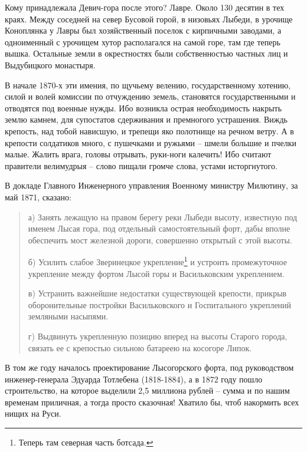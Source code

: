 Кому принадлежала Девич-гора после этого? Лавре. Около 130 десятин в тех краях. Между соседней на север Бусовой горой, в низовьях Лыбеди, в урочище Коноплянка у Лавры был хозяйственный поселок с кирпичными заводами, а одноименный с урочищем хутор располагался на самой горе, там где теперь вышка. Остальные земли в окрестностях были собственностью частных лиц и Выдубицкого монастыря.

В начале 1870-х эти имения, по щучьему велению, государственному хотению, силой и волей комиссии по отчуждению земель, становятся государственными и отводятся под военные нужды. Ибо возникла острая необходимость накрыть землю камнем, для супостатов сдерживания и премногого устрашения. Виждь крепость, над тобой нависшую, и трепещи яко полотнище на речном ветру. А в крепости солдатиков много, с пушечками и ружьями – шмели большие и пчелки малые. Жалить врага, головы отрывать, руки-ноги калечить! Ибо считают правители велимудрыя – слово пищали громче слова, устами исторгнутого.

В докладе Главного Инженерного управления Военному министру Милютину, за май 1871, сказано:

\begin{quotation}
а) Занять лежащую на правом берегу реки Лыбеди высоту, известную под именем Лысая гора, под отдельный самостоятельный форт, дабы вполне обеспечить мост железной дороги, совершенно открытый с этой высоты.

б) Усилить слабое Зверинецкое укрепление\footnote{Теперь там северная часть ботсада.} и устроить промежуточное укрепление между фортом Лысой горы и Васильковским укреплением.

в) Устранить важнейшие недостатки существующей крепости, прикрыв оборонительные постройки Васильковского и Госпитального укреплений земляными насыпями.

г) Выдвинуть укрепленную позицию вперед на высоты Старого города, связать ее с крепостью сильною батареею на косогоре Липок.
\end{quotation}

В том же году началось проектирование Лысогорского форта, под руководством инженер-генерала Эдуарда Тотлебена (1818-1884), а в 1872 году пошло строительство, на которое выделили 2,5 миллиона рублей – сумма и по нашим временам приличная, а тогда просто сказочная! Хватило бы, чтоб накормить всех нищих на Руси.


